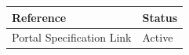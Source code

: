\documentclass[11pt,a4paper]{article}
\begin{document}
\begin{table}[h]
\begin{tabular}{|l|l|}
\hline
Reference & Status \\ \hline
Portal Specification Link & Active \\ \hline
\end{tabular}
\end{table}
\end{document}
